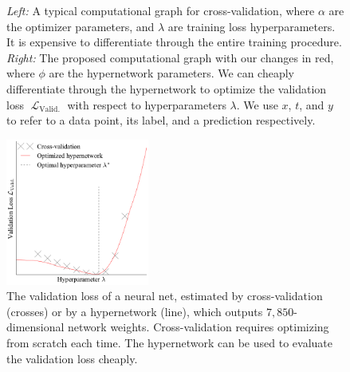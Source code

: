 \documentclass{article} %
\newcommand{\param}{\mathrm{w}} %
\newcommand{\hyper}{\lambda} %
\newcommand{\lossSymbol}{\mathop{\mathcal{L}}} %
\newcommand{\lossSymbolOuter}{\lossSymbol_{\mathrm{Valid.}}} %
\newcommand{\responseParam}{\phi} %
\begin{document}
\begin{figure}
\caption{%
\emph{Left:} A typical computational graph for cross-validation, where $\alpha$ are the optimizer parameters, and $\hyper$ are training loss hyperparameters.
It is expensive to differentiate through the entire training procedure.
\emph{Right:} The proposed computational graph with our changes in {\color{red} red}, where $\responseParam$ are the hypernetwork parameters.
We can cheaply differentiate through the hypernetwork to optimize the validation loss $\lossSymbolOuter$ with respect to hyperparameters $\hyper$.
We use $x$, $t$, and $y$ to refer to a data point, its label, and a prediction respectively.}
\end{figure}
%
\begin{figure}
	\centering
	\includegraphics[width=0.42\textwidth]{hypernets_global_small.pdf}
	\caption{
	The validation loss of a neural net, estimated by cross-validation (crosses) or by a hypernetwork (line), which outputs $7,850$-dimensional network weights.
	Cross-validation requires optimizing from scratch each time.
	The hypernetwork can be used to evaluate the validation loss cheaply.
	\label{fig:exp1}
	}
\end{figure}
\end{document}
